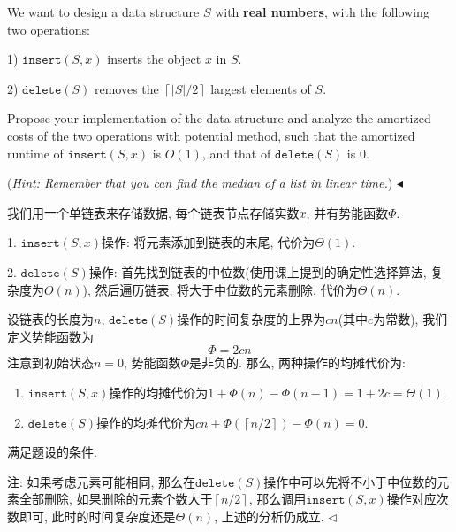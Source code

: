 \documentclass[11pt]{article}
\newenvironment{problem}[2][Problem]{\begin{trivlist}
\item[\hskip \labelsep{\bfseries#1}\hskip\labelsep{\bfseries#2.}]}{\hfill$\blacktriangleleft$\end{trivlist}}
\newenvironment{answer}[1][Answer]{\begin{trivlist}
\item[\hskip \labelsep{\bfseries\itshape#1.}\hskip \labelsep]}{\hfill$\lhd$\end{trivlist}}
\begin{document}
\begin{problem}{2. (Potential Method)}
  We want to design a data structure $S$ with \textbf{real numbers}, with the following two operations: 

  1) $\mathtt{insert}(S,x)$ inserts the object $x$ in $S$.
  
  2) $\mathtt{delete}(S)$ removes the $\left\lceil|S|/2\right\rceil$ largest elements of $S$. 
  
  Propose your implementation of the data structure and analyze the amortized costs of the two operations with potential method, such that the amortized runtime of $\mathtt{insert}(S,x)$ is $O(1)$, and that of $\mathtt{delete}(S)$ is 0.

  (\textit{Hint: Remember that you can find the median of a list in linear time.})
\end{problem}
\begin{answer}
我们用一个单链表来存储数据, 每个链表节点存储实数$x$, 并有势能函数$\Phi$.

1. $\mathtt{insert}(S, x)$操作: 将元素添加到链表的末尾, 代价为$\Theta(1)$.

2. $\mathtt{delete}(S)$操作: 首先找到链表的中位数(使用课上提到的确定性选择算法, 复杂度为$O(n)$), 然后遍历链表, 将大于中位数的元素删除, 代价为$\Theta(n)$.

设链表的长度为$n$, $\mathtt{delete}(S)$操作的时间复杂度的上界为$cn$(其中$c$为常数), 我们定义势能函数为
\[\Phi = 2cn\]
注意到初始状态$n = 0$, 势能函数$\Phi$是非负的. 那么, 两种操作的均摊代价为:
\begin{enumerate}
    \item  $\mathtt{insert}(S, x)$操作的均摊代价为$1 + \Phi(n) - \Phi(n-1) = 1 + 2c = \Theta(1)$.
    \item  $\mathtt{delete}(S)$操作的均摊代价为$cn + \Phi(\left\lceil n/2\right\rceil) - \Phi(n) = 0$.
\end{enumerate}
满足题设的条件.

注: 如果考虑元素可能相同, 那么在$\mathtt{delete}(S)$操作中可以先将不小于中位数的元素全部删除, 如果删除的元素个数大于$\left\lceil n/2\right\rceil$, 那么调用$\mathtt{insert}(S, x)$操作对应次数即可, 此时的时间复杂度还是$\Theta(n)$, 上述的分析仍成立.
\end{answer}
\end{document}

